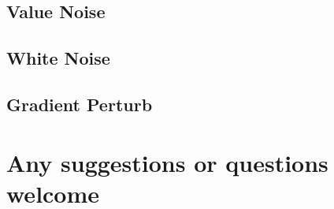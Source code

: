 \subsection*{Value Noise}



\subsection*{White Noise}



\subsection*{Gradient Perturb}







\section*{Any suggestions or questions welcome}